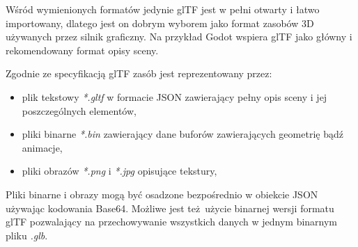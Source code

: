 Wśród wymienionych formatów jedynie glTF jest w pełni otwarty i łatwo importowany, dlatego jest on dobrym wyborem jako format zasobów 3D używanych przez silnik graficzny. Na przykład Godot \cite{godotengine} wspiera glTF jako główny i rekomendowany format opisy sceny.

Zgodnie ze specyfikacją glTF \cite{GLTFSPEC} zasób jest reprezentowany przez:
\begin{itemize}
	\item plik tekstowy \textit{*.gltf} w formacie JSON zawierający pełny opis sceny i jej poszczególnych elementów,
	\item pliki binarne \textit{*.bin} zawierający dane buforów zawierających geometrię bądź animacje,
	\item pliki obrazów \textit{*.png} i \textit{*.jpg} opisujące tekstury,
\end{itemize}
Pliki binarne i obrazy mogą być osadzone bezpośrednio w obiekcie JSON używając kodowania Base64.
Możliwe jest też użycie binarnej wersji formatu glTF pozwalający na przechowywanie wszystkich danych w jednym binarnym pliku \textit{.glb}.

